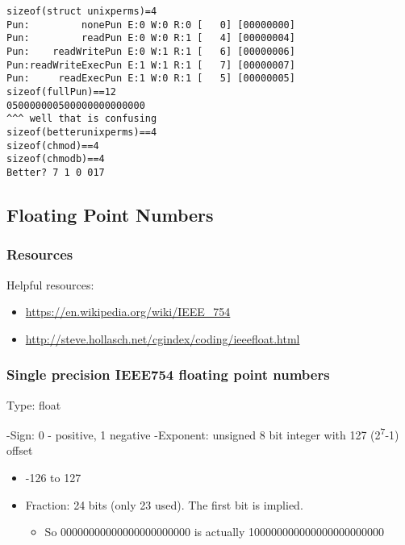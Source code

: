 \documentclass[11pt]{article}
\begin{document}
\begin{enumerate}
\begin{verbatim}
\end{verbatim}

\begin{verbatim}
sizeof(struct unixperms)=4
Pun:         nonePun E:0 W:0 R:0 [   0] [00000000]
Pun:         readPun E:0 W:0 R:1 [   4] [00000004]
Pun:    readWritePun E:0 W:1 R:1 [   6] [00000006]
Pun:readWriteExecPun E:1 W:1 R:1 [   7] [00000007]
Pun:     readExecPun E:1 W:0 R:1 [   5] [00000005]
sizeof(fullPun)==12
050000000500000000000000
^^^ well that is confusing
sizeof(betterunixperms)==4
sizeof(chmod)==4
sizeof(chmodb)==4
Better? 7 1 0 017
\end{verbatim}
\end{enumerate}

\subsection{Floating Point Numbers}
\label{sec:org6b81bb5}

\subsubsection{Resources}
\label{sec:org1be0c07}

Helpful resources:
\begin{itemize}
\item \url{https://en.wikipedia.org/wiki/IEEE\_754}
\item \url{http://steve.hollasch.net/cgindex/coding/ieeefloat.html}
\end{itemize}

\subsubsection{Single precision IEEE754 floating point numbers}
\label{sec:org3d56ef5}

Type: float

-Sign: 0 - positive, 1 negative
-Exponent: unsigned 8 bit integer with 127 (2\textsuperscript{7}-1) offset
\begin{itemize}
\item -126 to 127
\end{itemize}
\begin{itemize}
\item Fraction: 24 bits (only 23 used). The first bit is implied. 
\begin{itemize}
\item So 00000000000000000000000 is actually 100000000000000000000000
\end{itemize}
\end{itemize}
\end{document}
